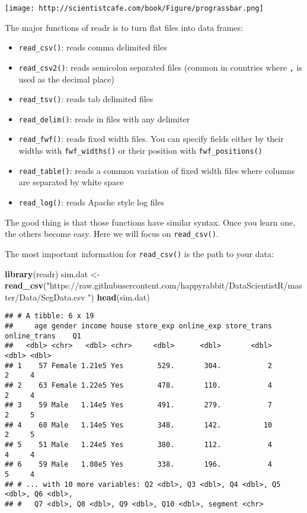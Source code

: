 \documentclass[
]{article}
\newenvironment{Shaded}{\begin{snugshade}}{\end{snugshade}}
\newcommand{\KeywordTok}[1]{\textcolor[rgb]{0.13,0.29,0.53}{\textbf{#1}}}
\newcommand{\NormalTok}[1]{#1}
\newcommand{\StringTok}[1]{\textcolor[rgb]{0.31,0.60,0.02}{#1}}
\providecommand{\tightlist}{%
  \setlength{\itemsep}{0pt}\setlength{\parskip}{0pt}}
\begin{document}
\texttt{[image: http://scientistcafe.com/book/Figure/prograssbar.png]}

The major functions of readr is to turn flat files into data frames:

\begin{itemize}
\tightlist
\item
  \texttt{read\_csv()}: reads comma delimited files
\item
  \texttt{read\_csv2()}: reads semicolon separated files (common in
  countries where \texttt{,} is used as the decimal place)
\item
  \texttt{read\_tsv()}: reads tab delimited files
\item
  \texttt{read\_delim()}: reads in files with any delimiter
\item
  \texttt{read\_fwf()}: reads fixed width files. You can specify fields
  either by their widths with \texttt{fwf\_widths()} or their position
  with \texttt{fwf\_positions()}\\
\item
  \texttt{read\_table()}: reads a common variation of fixed width files
  where columns are separated by white space
\item
  \texttt{read\_log()}: reads Apache style log files
\end{itemize}

The good thing is that those functions have similar syntax. Once you
learn one, the others become easy. Here we will focus on
\texttt{read\_csv()}.

The most important information for \texttt{read\_csv()} is the path to
your data:

\begin{Shaded}
\begin{Highlighting}[]
\KeywordTok{library}\NormalTok{(readr)}
\NormalTok{sim.dat <-}\StringTok{ }\KeywordTok{read_csv}\NormalTok{(}\StringTok{"https://raw.githubusercontent.com/happyrabbit/DataScientistR/master/Data/SegData.csv "}\NormalTok{)}
\KeywordTok{head}\NormalTok{(sim.dat)}
\end{Highlighting}
\end{Shaded}

\begin{verbatim}
## # A tibble: 6 x 19
##     age gender income house store_exp online_exp store_trans online_trans    Q1
##   <dbl> <chr>   <dbl> <chr>     <dbl>      <dbl>       <dbl>        <dbl> <dbl>
## 1    57 Female 1.21e5 Yes        529.       304.           2            2     4
## 2    63 Female 1.22e5 Yes        478.       110.           4            2     4
## 3    59 Male   1.14e5 Yes        491.       279.           7            2     5
## 4    60 Male   1.14e5 Yes        348.       142.          10            2     5
## 5    51 Male   1.24e5 Yes        380.       112.           4            4     4
## 6    59 Male   1.08e5 Yes        338.       196.           4            5     4
## # ... with 10 more variables: Q2 <dbl>, Q3 <dbl>, Q4 <dbl>, Q5 <dbl>, Q6 <dbl>,
## #   Q7 <dbl>, Q8 <dbl>, Q9 <dbl>, Q10 <dbl>, segment <chr>
\end{verbatim}
\end{document}

